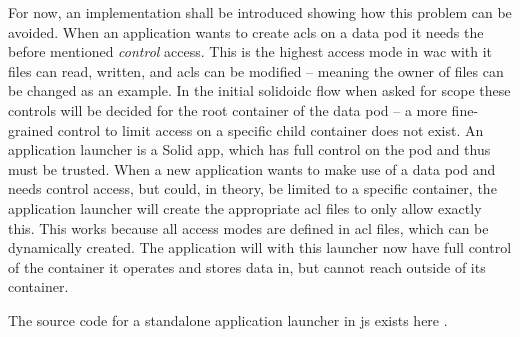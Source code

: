 For now, an implementation shall be introduced showing how this problem can be avoided. When an application wants to create \glspl{acl} on a data pod it needs the before mentioned \textit{control} access. This is the highest access mode in \gls{wac} with it files can read, written, and \glspl{acl} can be modified -- meaning the owner of files can be changed as an example.
In the initial \gls{solidoidc} flow when asked for scope these controls will be decided for the root container of the data pod -- a more fine-grained control to limit access on a specific child container does not exist. An application launcher is a Solid app, which has full control on the pod and thus must be trusted. When a new application wants to make use of a data pod and needs control access, but could, in theory, be limited to a specific container, the application launcher will create the appropriate \gls{acl} files to only allow exactly this.
This works because all access modes are defined in \gls{acl} files, which can be dynamically created. The application will with this launcher now have full control of the container it operates and stores data in, but cannot reach outside of its container.

The source code for a standalone application launcher in \gls{js} exists here \cite{app-launcher}.
